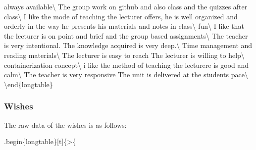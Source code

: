 \documentclass[
]{article}
\begin{document}
always available\textbackslash{} \hline The group work on github and
also class and the quizzes after class\textbackslash{} \hline I like the
mode of teaching the lecturer offers, he is well organized and orderly
in the way he presents his materials and notes in class\textbackslash{}
\hline fun\textbackslash{} \hline I like that the lecturer is on point
and brief and the group based assignments\textbackslash{} \hline The
teacher is very intentional. The knowledge acquired is very
deep.\textbackslash{} \hline Time management and reading
materials\textbackslash{} \hline The lecturer is easy to reach The
lecturer is willing to help\textbackslash{} \hline containerization
concept\textbackslash{} \hline i like the method of teaching the
lecturere is good and calm\textbackslash{} \hline The teacher is very
responsive The unit is delivered at the students pace\textbackslash{}
\bottomrule \textbackslash end\{longtable\}

\newpage

\subsubsection{Wishes}\label{wishes}

The raw data of the wishes is as follows:

.begin\{longtable\}{[}t{]}\{\textgreater\{

\raggedright
\end{document}
